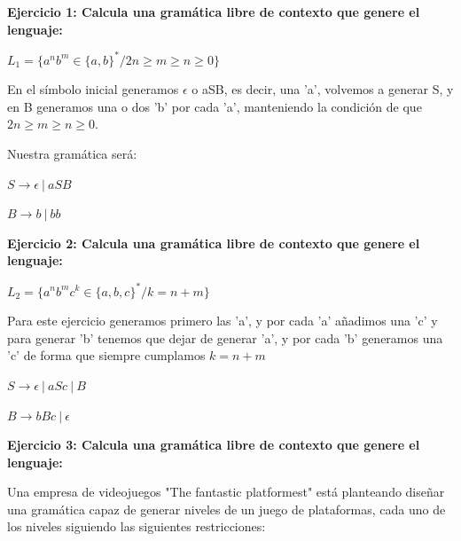 \documentclass[12pt, spanish]{article}
\begin{document}



\textbf{Ejercicio 1: Calcula una gramática libre de contexto que genere el lenguaje:}

\begin{center}

	$L_1 = \{ a^n b^m  \in \{a,b\}^* /  2n \geq m \geq n \geq 0\}$

\end{center}

En el símbolo inicial generamos $\epsilon$ o aSB, es decir, una 'a', volvemos a generar S, y en B generamos una o dos 'b'  por cada 'a', manteniendo la condición de que   $2n \geq m \geq n \geq 0$.

Nuestra gramática será:

\begin{center}
	$S \rightarrow \epsilon\ \vert\ aSB$
	
	$B \rightarrow b\ \vert\ bb$
\end{center}

\vspace{1.5cm}
\textbf{Ejercicio 2: Calcula una gramática libre de contexto que genere el lenguaje:}


\begin{center}

	$L_2 = \{ a^n b^m c^k  \in \{a,b,c\}^* /  k=n+m\}$

\end{center}

Para este ejercicio generamos primero las  'a', y por cada 'a' añadimos una 'c' y para generar 'b' tenemos que dejar de generar 'a', y por cada 'b' generamos una 'c' de forma que siempre cumplamos $k=n+m$

\begin{center}
	$S \rightarrow \epsilon\ \vert\ aSc\ \vert\ B$
	
	$B \rightarrow bBc\ \vert\ \epsilon$
\end{center}


\newpage

\textbf{Ejercicio 3: Calcula una gramática libre de contexto que genere el lenguaje:}

Una empresa de videojuegos "The fantastic platformest" está planteando diseñar una gramática capaz de generar niveles de un juego de plataformas, cada uno de los niveles siguiendo las siguientes restricciones:
\end{document}
